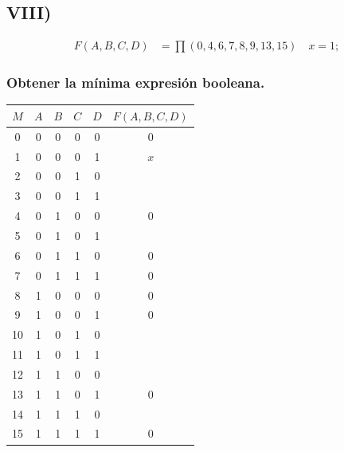 \subsection{VIII)}

{\large
    \begin{align*}
    F(A, B, C, D) &= \prod(0, 4, 6, 7, 8, 9, 13, 15) \quad x = 1;
    \end{align*}
}

\subsubsection{Obtener la mínima expresión booleana.}

\begin{center}
\begin{tabular}{c|cccc|c}
\rowcolor[HTML]{FFCCC9} 
\cellcolor[HTML]{9AFF99}$M$ & $A$ & $B$ & $C$ & $D$ & \cellcolor[HTML]{FFFFC7}$F(A,B,C,D)$ \\ \hline
0                           & 0   & 0   & 0   & 0   & 0                                    \\
1                           & 0   & 0   & 0   & 1   & $x$                                     \\
2                           & 0   & 0   & 1   & 0   &                                      \\
3                           & 0   & 0   & 1   & 1   &                                      \\
4                           & 0   & 1   & 0   & 0   & 0                                    \\
5                           & 0   & 1   & 0   & 1   &                                      \\
6                           & 0   & 1   & 1   & 0   & 0                                    \\
7                           & 0   & 1   & 1   & 1   & 0                                    \\
8                           & 1   & 0   & 0   & 0   & 0                                    \\
9                           & 1   & 0   & 0   & 1   & 0                                    \\
10                          & 1   & 0   & 1   & 0   &                                      \\
11                          & 1   & 0   & 1   & 1   &                                      \\
12                          & 1   & 1   & 0   & 0   &                                      \\
13                          & 1   & 1   & 0   & 1   & 0                                    \\
14                          & 1   & 1   & 1   & 0   &                                      \\
15                          & 1   & 1   & 1   & 1   & 0                                   
\end{tabular}
\end{center}

